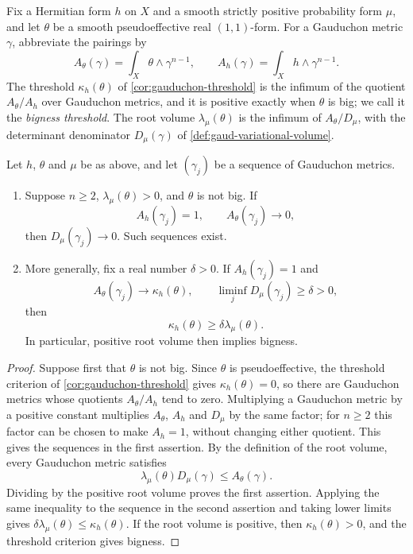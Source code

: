 Fix a Hermitian form $h$ on $X$ and a smooth strictly positive probability form $\mu$, and let $\theta$ be a smooth pseudoeffective real $(1,1)$-form. For a Gauduchon metric $\gamma$, abbreviate the pairings by
\[
 A_\theta(\gamma)=\int_X\theta\wedge\gamma^{n-1},
 \qquad A_h(\gamma)=\int_Xh\wedge\gamma^{n-1}.
\]
The threshold $\kappa_h(\theta)$ of \cref{cor:gauduchon-threshold} is the infimum of the quotient $A_\theta/A_h$ over Gauduchon metrics, and it is positive exactly when $\theta$ is big; we call it the \emph{bigness threshold}. The root volume $\lambda_\mu(\theta)$ is the infimum of $A_\theta/D_\mu$, with the determinant denominator $D_\mu(\gamma)$ of \cref{def:gaud-variational-volume}.

\begin{proposition}\label{prop:gaud-positive-volume-collapse}
Let $h$, $\theta$ and $\mu$ be as above, and let $(\gamma_j)$ be a sequence of Gauduchon metrics.
\begin{enumerate}
\item Suppose $n\geq2$, $\lambda_\mu(\theta)>0$, and $\theta$ is not big. If
\[
 A_h(\gamma_j)=1,\qquad A_\theta(\gamma_j)\longrightarrow0,
\]
then $D_\mu(\gamma_j)\to0$. Such sequences exist.
\item More generally, fix a real number $\delta>0$. If $A_h(\gamma_j)=1$ and
\[
 A_\theta(\gamma_j)\longrightarrow\kappa_h(\theta),
 \qquad \liminf_jD_\mu(\gamma_j)\geq\delta>0,
\]
then
\[
 \kappa_h(\theta)\geq\delta\lambda_\mu(\theta).
\]
In particular, positive root volume then implies bigness.
\end{enumerate}
\end{proposition}
\begin{proof}
Suppose first that $\theta$ is not big. Since $\theta$ is pseudoeffective, the threshold criterion of \cref{cor:gauduchon-threshold} gives $\kappa_h(\theta)=0$, so there are Gauduchon metrics whose quotients $A_\theta/A_h$ tend to zero. Multiplying a Gauduchon metric by a positive constant multiplies $A_\theta$, $A_h$ and $D_\mu$ by the same factor; for $n\geq2$ this factor can be chosen to make $A_h=1$, without changing either quotient. This gives the sequences in the first assertion. By the definition of the root volume, every Gauduchon metric satisfies
\begin{equation}\label{eq:gaud-collapse-basic}
 \lambda_\mu(\theta)D_\mu(\gamma)\leq A_\theta(\gamma).
\end{equation}
Dividing by the positive root volume proves the first assertion. Applying the same inequality to the sequence in the second assertion and taking lower limits gives $\delta\lambda_\mu(\theta)\leq\kappa_h(\theta)$. If the root volume is positive, then $\kappa_h(\theta)>0$, and the threshold criterion gives bigness.
\end{proof}

